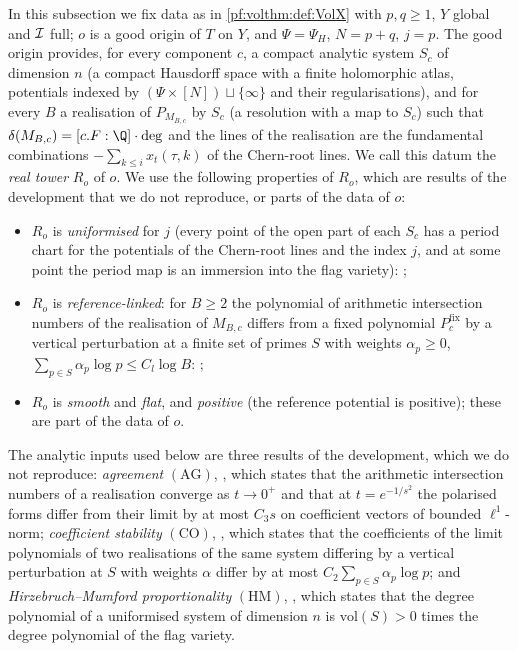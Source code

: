 In this subsection we fix data as in \cref{pf:volthm:def:VolX} with $p,q\ge1$, $Y$ global and $\mathcal{I}$ full; $o$ is
a good origin of $T$ on $Y$, and $\Psi=\Psi_H$, $N=p+q$, $j=p$. The good origin provides, for every
component $c$, a compact analytic system $S_c$ of dimension $n$ (a compact Hausdorff space with a finite
holomorphic atlas, potentials indexed by $(\Psi\times[N])\sqcup\{\infty\}$ and their regularisations), and for
every $B$ a realisation of $P_{M_{B,c}}$ by $S_c$ (a resolution with a map to $S_c$) such that
$\delta(M_{B,c})=[c.F:\Q]\cdot\deg$ and the lines of the realisation are the fundamental combinations
$-\sum_{k\le i}x_t(\tau,k)$ of the Chern-root lines. We call this datum the \emph{real tower} $R_o$ of $o$. We use
the following properties of $R_o$, which are results of the development that we do not reproduce, or parts of the data of $o$:
\begin{itemize}
\item $R_o$ is \emph{uniformised} for $j$ (every point of the open part of each $S_c$ has a period chart for the
  potentials of the Chern-root lines and the index $j$, and at some point the period map is an immersion into the
  flag variety): ;
\item $R_o$ is \emph{reference-linked}: for $B\ge2$ the polynomial of arithmetic intersection numbers of the
  realisation of $M_{B,c}$ differs from a fixed polynomial $P^{\mathrm{fix}}_c$ by a vertical perturbation at a
  finite set of primes $S$ with weights $\alpha_p\ge0$, $\sum_{p\in S}\alpha_p\log p\le C_l\log B$:
  ;
\item $R_o$ is \emph{smooth} and \emph{flat}, and \emph{positive} (the reference potential is positive); these are
  part of the data of $o$.
\end{itemize}
The analytic inputs used below are three results of the development, which we do not reproduce:
\emph{agreement} $(\mathrm{AG})$, , which states that the arithmetic
intersection numbers of a realisation converge as $t\to0^+$ and that at $t=e^{-1/s^2}$ the polarised forms differ
from their limit by at most $C_3s$ on coefficient vectors of bounded $\ell^1$-norm; \emph{coefficient stability}
$(\mathrm{CO})$, , which states that the coefficients of the limit polynomials
of two realisations of the same system differing by a vertical perturbation at $S$ with weights $\alpha$ differ by
at most $C_2\sum_{p\in S}\alpha_p\log p$; and \emph{Hirzebruch--Mumford proportionality} $(\mathrm{HM})$,
, which states that the degree polynomial of a
uniformised system of dimension $n$ is $\mathrm{vol}(S)>0$ times the degree polynomial of the flag variety.

